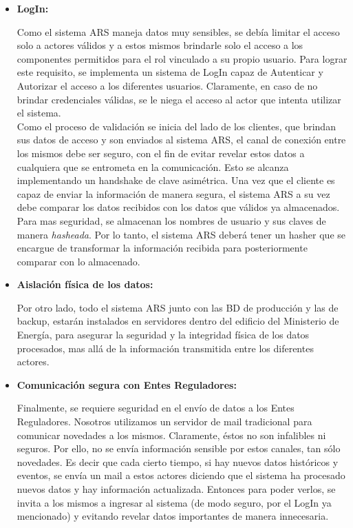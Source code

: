 \begin{itemize}
    \item \textbf{LogIn:} 
    \par Como el sistema ARS maneja datos muy sensibles, se debía limitar el acceso solo a actores válidos y a estos mismos brindarle solo el acceso a los componentes permitidos para el rol vinculado a su propio usuario. Para lograr este requisito, se implementa un sistema de LogIn capaz de Autenticar y Autorizar el acceso a los diferentes usuarios. Claramente, en caso de no brindar credenciales válidas, se le niega el acceso al actor que intenta utilizar el sistema.\\
    Como el proceso de validación se inicia del lado de los clientes, que brindan sus datos de acceso y son enviados al sistema ARS, el canal de conexión entre los mismos debe ser seguro, con el fin de evitar revelar estos datos a cualquiera que se entrometa en la comunicación. Esto se alcanza implementando un handshake de clave asimétrica. 
    Una vez que el cliente es capaz de enviar la información de manera segura, el sistema ARS a su vez debe comparar los datos recibidos con los datos que válidos ya almacenados. Para mas seguridad, se almacenan los nombres de usuario y sus claves de manera \textit{hasheada}. Por lo tanto, el sistema ARS deberá tener un hasher que se encargue de transformar la información recibida para posteriormente comparar con lo almacenado.\\
    \item \textbf{Aislación física de los datos:} 
    \par Por otro lado, todo el sistema ARS junto con las BD de producción y las de backup, estarán instalados en servidores dentro del edificio del Ministerio de Energía, para asegurar la seguridad y la integridad física de los datos procesados, mas allá de la información transmitida entre los diferentes actores.\\
    \item \textbf{Comunicación segura con Entes Reguladores:} 
    \par Finalmente, se requiere seguridad en el envío de datos a los Entes Reguladores. Nosotros utilizamos un servidor de mail tradicional para comunicar novedades a los mismos. Claramente, éstos no son infalibles ni seguros. Por ello, no se envía información sensible por estos canales, tan sólo novedades. Es decir que cada cierto tiempo, si hay nuevos datos históricos y eventos, se envía un mail a estos actores diciendo que el sistema ha procesado nuevos datos y hay información actualizada. Entonces para poder verlos, se invita a los mismos a ingresar al sistema (de modo seguro, por el LogIn ya mencionado) y evitando revelar datos importantes de manera innecesaria.
\end{itemize}


